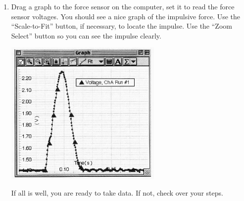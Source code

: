 \begin{enumerate}[label=\arabic*.]
\item Drag a graph to the force sensor on the computer, set it to read the force sensor voltages.  You should see a nice graph of the impulsive force.  Use the ``Scale-to-Fit'' button, if necessary, to locate the impulse.  Use the ``Zoom Select'' button so you can see the impulse clearly.
\begin{center} \includegraphics*[width=0.6\textwidth]{imgs/6labs/6Alab/6Aexp5/MI_graph1_fix3.jpg} \end{center}
If all is well, you are ready to take data.  If not, check over your steps.


\end{enumerate}

